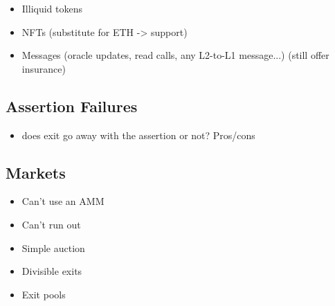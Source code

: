 \begin{itemize}
\item Illiquid tokens 
\item NFTs (substitute for ETH -> support)
\item Messages (oracle updates, read calls, any L2-to-L1 message...) (still offer insurance)
\end{itemize}

\subsection{Assertion Failures}

\begin{itemize}
\item does exit go away with the assertion or not? Pros/cons
\end{itemize}

\subsection{Markets}
\label{sec:uniswap}

\begin{itemize}
\item Can't use an AMM 
\item Can't run out
\item Simple auction
\item Divisible exits
\item Exit pools
\end{itemize}












